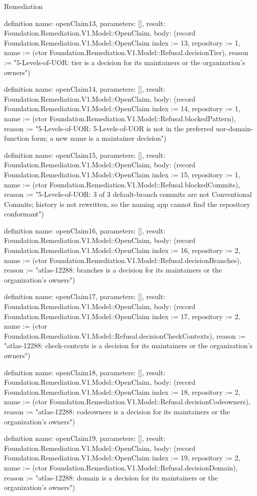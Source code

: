 \begin{lexlean}{Remediation}
\begin{semanticmodule}
definition{
  name: openClaim13,
  parameters: [],
  result: Foundation.Remediation.V1.Model::OpenClaim,
  body: (record Foundation.Remediation.V1.Model::OpenClaim {index := 13, repository := 1, name := (ctor Foundation.Remediation.V1.Model::Refusal.decisionTier), reason := "5-Levels-of-UOR: tier is a decision for its maintainers or the organization's owners"})
}

definition{
  name: openClaim14,
  parameters: [],
  result: Foundation.Remediation.V1.Model::OpenClaim,
  body: (record Foundation.Remediation.V1.Model::OpenClaim {index := 14, repository := 1, name := (ctor Foundation.Remediation.V1.Model::Refusal.blockedPattern), reason := "5-Levels-of-UOR: 5-Levels-of-UOR is not in the preferred uor-{domain}-{function} form; a new name is a maintainer decision"})
}

definition{
  name: openClaim15,
  parameters: [],
  result: Foundation.Remediation.V1.Model::OpenClaim,
  body: (record Foundation.Remediation.V1.Model::OpenClaim {index := 15, repository := 1, name := (ctor Foundation.Remediation.V1.Model::Refusal.blockedCommits), reason := "5-Levels-of-UOR: 3 of 3 default-branch commits are not Conventional Commits; history is not rewritten, so the naming app cannot find the repository conformant"})
}

definition{
  name: openClaim16,
  parameters: [],
  result: Foundation.Remediation.V1.Model::OpenClaim,
  body: (record Foundation.Remediation.V1.Model::OpenClaim {index := 16, repository := 2, name := (ctor Foundation.Remediation.V1.Model::Refusal.decisionBranches), reason := "atlas-12288: branches is a decision for its maintainers or the organization's owners"})
}

definition{
  name: openClaim17,
  parameters: [],
  result: Foundation.Remediation.V1.Model::OpenClaim,
  body: (record Foundation.Remediation.V1.Model::OpenClaim {index := 17, repository := 2, name := (ctor Foundation.Remediation.V1.Model::Refusal.decisionCheckContexts), reason := "atlas-12288: check-contexts is a decision for its maintainers or the organization's owners"})
}

definition{
  name: openClaim18,
  parameters: [],
  result: Foundation.Remediation.V1.Model::OpenClaim,
  body: (record Foundation.Remediation.V1.Model::OpenClaim {index := 18, repository := 2, name := (ctor Foundation.Remediation.V1.Model::Refusal.decisionCodeowners), reason := "atlas-12288: codeowners is a decision for its maintainers or the organization's owners"})
}

definition{
  name: openClaim19,
  parameters: [],
  result: Foundation.Remediation.V1.Model::OpenClaim,
  body: (record Foundation.Remediation.V1.Model::OpenClaim {index := 19, repository := 2, name := (ctor Foundation.Remediation.V1.Model::Refusal.decisionDomain), reason := "atlas-12288: domain is a decision for its maintainers or the organization's owners"})
}


\end{semanticmodule}
\end{lexlean}

